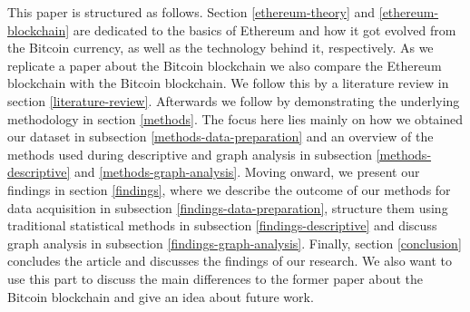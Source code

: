 This paper is structured as follows. 
Section \ref{ethereum-theory} and \ref{ethereum-blockchain} are dedicated to the basics of Ethereum and how it got evolved from the Bitcoin currency, as well as the technology behind it, respectively. 
As we replicate a paper about the Bitcoin blockchain \cite{lischke2016analyzing} we also compare the Ethereum blockchain with the Bitcoin blockchain. We follow this by a literature review in section \ref{literature-review}.
Afterwards we follow by demonstrating the underlying methodology in section \ref{methods}. 
The focus here lies mainly on how we obtained our dataset in subsection \ref{methods-data-preparation} and an overview of the methods used during descriptive and graph analysis in subsection \ref{methods-descriptive} and \ref{methods-graph-analysis}. 
Moving onward, we present our findings in section \ref{findings}, where we describe the outcome of our methods for data acquisition in subsection \ref{findings-data-preparation}, structure them using traditional statistical methods in subsection \ref{findings-descriptive} and discuss graph analysis in subsection \ref{findings-graph-analysis}.
Finally, section \ref{conclusion} concludes the article and discusses the findings of our research. 
We also want to use this part to discuss the main differences to the former paper about the Bitcoin blockchain and give an idea about future work. 
